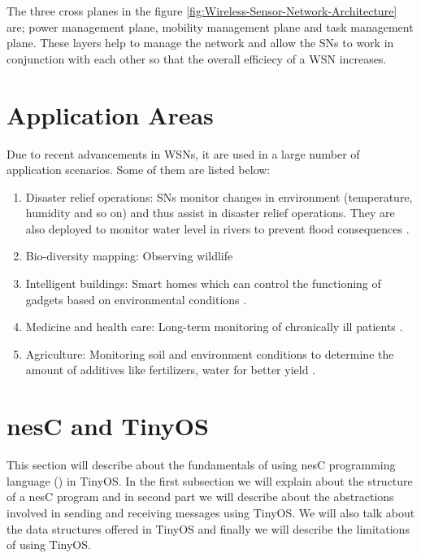 \par

The three cross planes in the figure \ref{fig:Wireless-Sensor-Network-Architecture} are; power management plane, mobility management plane and task management plane. These layers help to manage the network and allow the \acp{SN} to work in conjunction with each other so that the overall efficiecy of a \ac{WSN} increases. 

\section{Application Areas}

Due to recent advancements in \acp{WSN}, it  are used in a large number of application scenarios. Some of them are listed below:

\begin{enumerate}
    \item Disaster relief operations: \acp{SN} monitor changes in environment (temperature, humidity and so on) and thus assist in disaster relief operations. They are also deployed to monitor water level in rivers to prevent flood consequences \cite{cayirci2007sendrom}.  
    
    \item Bio-diversity mapping: Observing wildlife \cite{juang2002energy}
    
    \item Intelligent buildings: Smart homes which can control the functioning of gadgets based on environmental conditions \cite{han2010smart}.
    
    \item Medicine and health care: Long-term monitoring of chronically ill patients \cite{pantelopoulos2010survey}.
    
    \item Agriculture: Monitoring soil and environment conditions to determine the amount of additives like fertilizers, water for better yield \cite{baggio2005wireless}.
\end{enumerate}

\section{nesC and TinyOS}{\label{section:nescTinyOS}}
This section will describe about the fundamentals of using nesC programming language (\cite{website:nesc}) in TinyOS. In the first subsection we will explain about the structure of a nesC program and in second part we will describe about the abstractions involved in sending and receiving messages using TinyOS. We will also talk about the data structures offered in TinyOS and finally we will describe the limitations of using TinyOS.   

